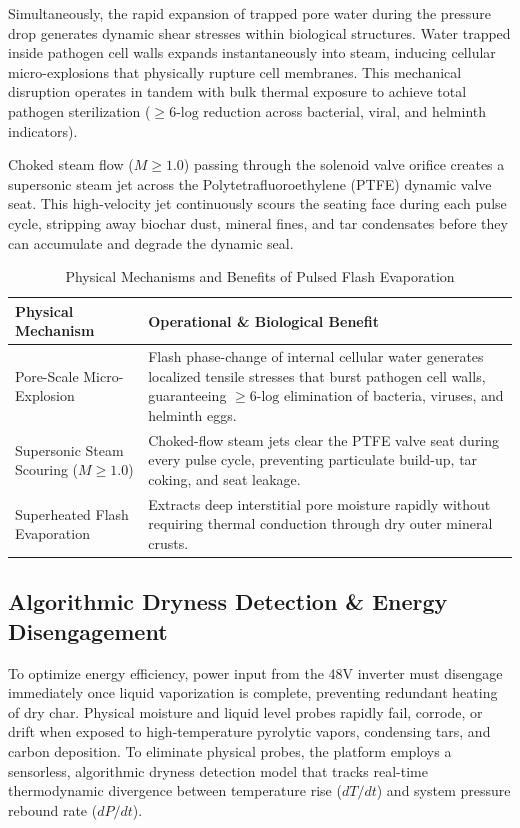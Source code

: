 \documentclass[10pt,twocolumn,a4paper]{article}
\begin{document}
Simultaneously, the rapid expansion of trapped pore water during the pressure drop generates dynamic shear stresses within biological structures. Water trapped inside pathogen cell walls expands instantaneously into steam, inducing cellular micro-explosions that physically rupture cell membranes. This mechanical disruption operates in tandem with bulk thermal exposure to achieve total pathogen sterilization ($\ge 6\text{-log}$ reduction across bacterial, viral, and helminth indicators).

Choked steam flow ($M \ge 1.0$) passing through the solenoid valve orifice creates a supersonic steam jet across the Polytetrafluoroethylene (PTFE) dynamic valve seat. This high-velocity jet continuously scours the seating face during each pulse cycle, stripping away biochar dust, mineral fines, and tar condensates before they can accumulate and degrade the dynamic seal.

\begin{table}[t]
\centering
\caption{Physical Mechanisms and Benefits of Pulsed Flash Evaporation}
\label{tab:flash_benefits}
\begin{tabular}{p{5.0cm} p{11.0cm}}
\toprule
\textbf{Physical Mechanism} & \textbf{Operational \& Biological Benefit} \\
\midrule
Pore-Scale Micro-Explosion & Flash phase-change of internal cellular water generates localized tensile stresses that burst pathogen cell walls, guaranteeing $\ge 6\text{-log}$ elimination of bacteria, viruses, and helminth eggs. \\
Supersonic Steam Scouring ($M \ge 1.0$) & Choked-flow steam jets clear the PTFE valve seat during every pulse cycle, preventing particulate build-up, tar coking, and seat leakage. \\
Superheated Flash Evaporation & Extracts deep interstitial pore moisture rapidly without requiring thermal conduction through dry outer mineral crusts. \\
\bottomrule
\end{tabular}
\end{table}

\subsection{Algorithmic Dryness Detection \& Energy Disengagement}

To optimize energy efficiency, power input from the 48V inverter must disengage immediately once liquid vaporization is complete, preventing redundant heating of dry char. Physical moisture and liquid level probes rapidly fail, corrode, or drift when exposed to high-temperature pyrolytic vapors, condensing tars, and carbon deposition. To eliminate physical probes, the platform employs a sensorless, algorithmic dryness detection model that tracks real-time thermodynamic divergence between temperature rise ($dT/dt$) and system pressure rebound rate ($dP/dt$).
\end{document}
